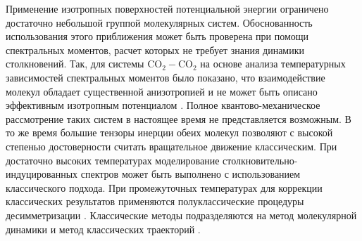 Применение изотропных поверхностей потенциальной энергии ограничено достаточно небольшой группой молекулярных систем. Обоснованность использования этого приближения может быть проверена при помощи спектральных моментов, расчет которых не требует знания динамики столкновений. Так, для системы CO$_2-$CO$_2$ на основе анализа температурных зависимостей спектральных моментов было показано, что взаимодействие молекул обладает существенной анизотропией и не может быть описано эффективным изотропным потенциалом \cite{gruszka1996}. Полное квантово-механическое рассмотрение таких систем в настоящее время не представляется возможным. В то же время большие тензоры инерции обеих молекул позволяют с высокой степенью достоверности считать вращательное движение классическим. При достаточно высоких температурах моделирование столкновительно-индуцированных спектров может быть выполнено с использованием классического подхода. При промежуточных температурах для коррекции классических результатов применяются полуклассические процедуры десимметризации \cite{frommhold}. Классические методы подразделяются на метод молекулярной динамики \cite{gruszka1996, bussery2014} и метод классических траекторий \cite{oparin2017}. 

